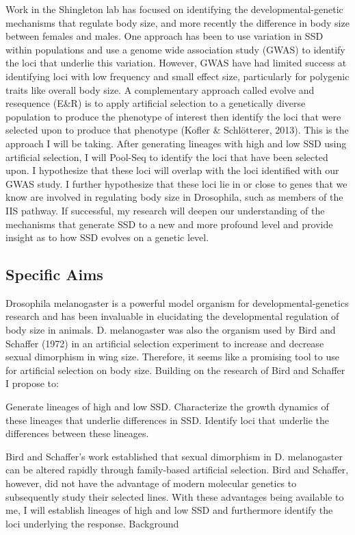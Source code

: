 \documentclass[
  11pt,
]{article}
\begin{document}
Work in the Shingleton lab has focused on identifying the
developmental-genetic mechanisms that regulate body size, and more
recently the difference in body size between females and males. One
approach has been to use variation in SSD within populations and use a
genome wide association study (GWAS) to identify the loci that underlie
this variation. However, GWAS have had limited success at identifying
loci with low frequency and small effect size, particularly for
polygenic traits like overall body size. A complementary approach called
evolve and resequence (E\&R) is to apply artificial selection to a
genetically diverse population to produce the phenotype of interest then
identify the loci that were selected upon to produce that phenotype
(Kofler \& Schlötterer, 2013). This is the approach I will be taking.
After generating lineages with high and low SSD using artificial
selection, I will Pool-Seq to identify the loci that have been selected
upon. I hypothesize that these loci will overlap with the loci
identified with our GWAS study. I further hypothesize that these loci
lie in or close to genes that we know are involved in regulating body
size in Drosophila, such as members of the IIS pathway. If successful,
my research will deepen our understanding of the mechanisms that
generate SSD to a new and more profound level and provide insight as to
how SSD evolves on a genetic level.

\subsection{Specific Aims}

Drosophila melanogaster is a powerful model organism for
developmental-genetics research and has been invaluable in elucidating
the developmental regulation of body size in animals. D. melanogaster
was also the organism used by Bird and Schaffer (1972) in an artificial
selection experiment to increase and decrease sexual dimorphism in wing
size. Therefore, it seems like a promising tool to use for artificial
selection on body size. Building on the research of Bird and Schaffer I
propose to:

Generate lineages of high and low SSD. Characterize the growth dynamics
of these lineages that underlie differences in SSD. Identify loci that
underlie the differences between these lineages.

Bird and Schaffer's work established that sexual dimorphism in D.
melanogaster can be altered rapidly through family-based artificial
selection. Bird and Schaffer, however, did not have the advantage of
modern molecular genetics to subsequently study their selected lines.
With these advantages being available to me, I will establish lineages
of high and low SSD and furthermore identify the loci underlying the
response. Background
\end{document}
